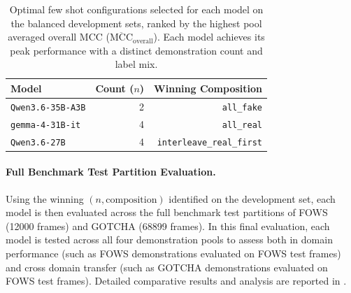\begin{table}[t]
	\centering
	\caption{Optimal few shot configurations selected for each model on the balanced development sets, ranked by the highest pool averaged overall MCC ($\overline{\text{MCC}}_{\text{overall}}$). Each model achieves its peak performance with a distinct demonstration count and label mix.}
	\label{tab:fewshot_winners}
	\begin{tabular}{lrr}
		\toprule
		\textbf{Model} & \textbf{Count ($n$)} & \textbf{Winning Composition} \\
		\midrule
		\texttt{Qwen3.6-35B-A3B} & \num{2} & \texttt{all\_fake} \\
		\texttt{gemma-4-31B-it}  & \num{4} & \texttt{all\_real} \\
		\texttt{Qwen3.6-27B}     & \num{4} & \texttt{interleave\_real\_first} \\
		\bottomrule
	\end{tabular}
\end{table}

\paragraph{Full Benchmark Test Partition Evaluation.}
Using the winning $(n, \text{composition})$ identified on the development set, each model is then evaluated across the full benchmark test partitions of FOWS (\num{12000} frames) and GOTCHA (\num{68899} frames). In this final evaluation, each model is tested across all four demonstration pools to assess both in domain performance (such as FOWS demonstrations evaluated on FOWS test frames) and cross domain transfer (such as GOTCHA demonstrations evaluated on FOWS test frames). Detailed comparative results and analysis are reported in .


